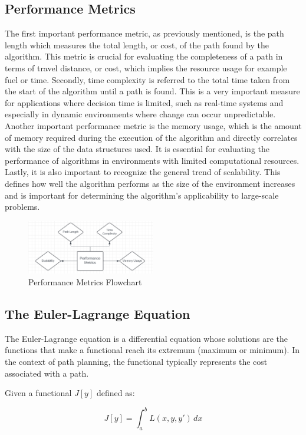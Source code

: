 \documentclass[12pt]{article}
\begin{document}
\subsection{Performance Metrics}
The first important performance metric, as previously mentioned, is the path length which measures the total length, or cost, of the path found by the algorithm. This metric is crucial for evaluating the completeness of a path in terms of travel distance, or cost, which        implies the resource usage for example fuel or time. 
Secondly, time complexity is referred to the total time taken from the start of the algorithm until a path is found. This is a very important measure for applications where decision time is limited, such as real-time systems and especially in dynamic environments where change can occur unpredictable. 
Another important performance metric is the memory usage, which is the amount of memory required during the execution of the algorithm and directly correlates with the size of the data structures used. It is essential for evaluating the performance of algorithms in environments with limited computational resources. 
Lastly, it is also important to recognize the general trend of scalability. This defines how well the algorithm performs as the size of the environment increases and is important for determining the algorithm’s applicability to large-scale problems. 
\begin{figure}[h!]

  \centering
  \includegraphics[width=0.5\textwidth]{Screenshot 2024-06-05 084029.png}
    \caption{Performance Metrics Flowchart}
\end{figure}
\newpage
\subsection{The Euler-Lagrange Equation}
The Euler-Lagrange equation is a differential equation whose solutions are the functions that make a functional reach its extremum (maximum or minimum). In the context of path planning, the functional typically represents the cost associated with a path.

Given a functional \( J[y] \) defined as:

\[
J[y] = \int_{a}^{b} L(x, y, y') \, dx
\]
\end{document}
